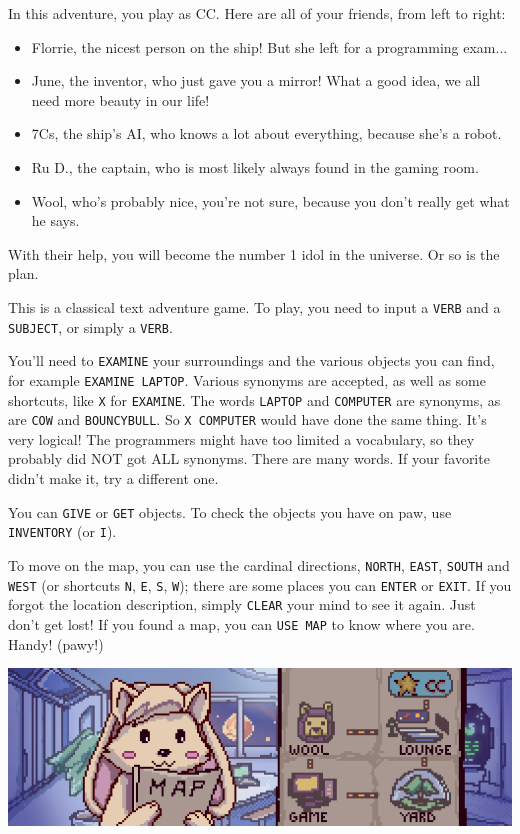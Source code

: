 \documentclass{article}
\newcommand{\bckg}[1]{\AddToShipoutPictureBG*{\texttt{[image: \#1]}}}
\begin{document}
In this adventure, you play as CC.
Here are all of your friends, from left to right:
\begin{itemize}
    \item Florrie, the nicest person on the ship! But she left for a programming exam...
    \item June, the inventor, who just gave you a mirror! What a good idea, we all need more beauty in our life!
    \item 7Cs, the ship's AI, who knows a lot about everything, because she's a robot.
    \item Ru D., the captain, who is most likely always found in the gaming room.
    \item Wool, who's probably nice, you're not sure, because you don't really get what he says.
\end{itemize}

With their help, you will become the number 1 idol in the universe. Or so is the plan.

\clearpage
{}
\bckg{img/bg}

This is a classical text adventure game.
To play, you need to input a \texttt{VERB} and a \texttt{SUBJECT}, or simply a \texttt{VERB}.

You'll need to \texttt{EXAMINE} your surroundings and the various objects you can find,
for example \texttt{EXAMINE LAPTOP}.
Various synonyms are accepted, as well as some shortcuts, like \texttt{X} for \texttt{EXAMINE}.
The words \texttt{LAPTOP} and \texttt{COMPUTER} are synonyms, as are \texttt{COW} and \texttt{BOUNCYBULL}.
So \texttt{X COMPUTER} would have done the same thing.
It's very logical!
The programmers might have too limited a vocabulary, so they probably did NOT got ALL synonyms.
There are many words. If your favorite didn't make it, try a different one.

You can \texttt{GIVE} or \texttt{GET} objects. To check the objects you have on paw,
use \texttt{INVENTORY} (or \texttt{I}).

To move on the map, you can use the cardinal directions, \texttt{NORTH}, \texttt{EAST},
\texttt{SOUTH} and \texttt{WEST} (or shortcuts \texttt{N}, \texttt{E}, \texttt{S}, \texttt{W});
there are some places you can \texttt{ENTER} or \texttt{EXIT}.
If you forgot the location description, simply \texttt{CLEAR} your mind to see it again.
Just don't get lost! If you found a map, you can \texttt{USE MAP} to know where you are.
Handy! (pawy!)
\begin{center}
\includegraphics[height=.2\paperheight]{img/map_booklet}
\end{center}
\end{document}
